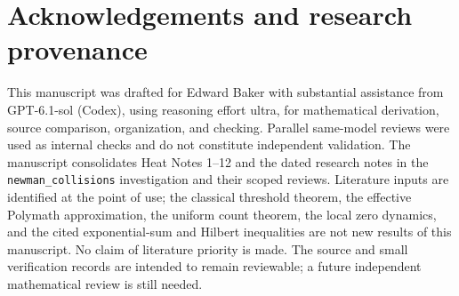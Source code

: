 \documentclass[11pt]{article}
\numberwithin{equation}{section}
\theoremstyle{definition}
\theoremstyle{remark}
\begin{document}
\section*{Acknowledgements and research provenance}
This manuscript was drafted for Edward Baker with substantial assistance
from GPT-6.1-sol (Codex), using reasoning effort ultra, for mathematical
derivation, source comparison, organization, and checking. Parallel
same-model reviews were used as internal checks and do not constitute
independent validation. The manuscript consolidates Heat Notes 1--12 and the dated research
notes in the \texttt{newman\_collisions} investigation and their scoped
reviews. Literature inputs are identified at the point of use; the
classical threshold theorem, the effective Polymath approximation,
the uniform count theorem, the local zero dynamics, and the cited
exponential-sum and Hilbert inequalities are not new
results of this manuscript. No claim of literature priority is made.
The source and small verification records are intended to remain
reviewable; a future independent mathematical review is still needed.
\end{document}
